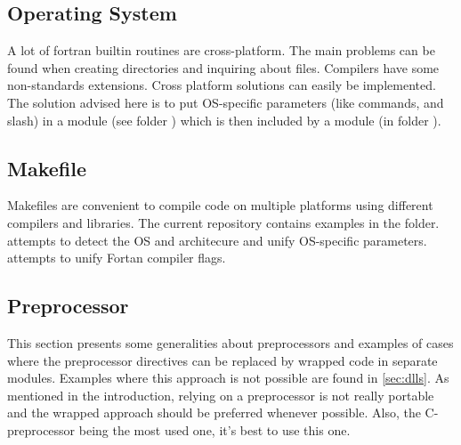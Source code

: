 \documentclass{article}
\begin{document}
\subsection{Operating System}
\label{sec:os}
A lot of fortran builtin routines are cross-platform. 
The main problems can be found when creating directories and inquiring about files.
Compilers have some non-standards extensions. Cross platform solutions can easily be implemented.
The solution advised here is to put OS-specific parameters (like commands, and slash) in a module  (see folder ) which is then included by a  module (in folder ).


\subsection{Makefile}
\label{sec:makefile}
Makefiles are convenient to compile code on multiple platforms using different compilers and libraries. The current repository contains examples in the \cmd{_\mkf} folder.
 attempts to detect the OS and architecure and unify OS-specific parameters.
 attempts to unify Fortan compiler flags.

\subsection{Preprocessor}
\label{sec:preprocessor}
This section presents some generalities about preprocessors and examples of cases where the preprocessor directives can be replaced by wrapped code in separate modules.
Examples where this approach is not possible are found in \autoref{sec:dlls}.
As mentioned in the introduction, relying on a preprocessor is not really portable and the wrapped approach should be preferred whenever possible. Also, the C-preprocessor being the most used one, it's best to use this one.
\end{document}
